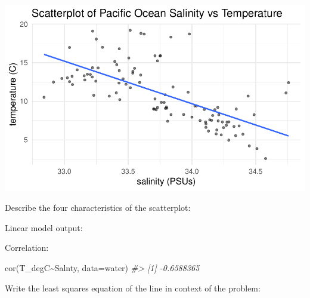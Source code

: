 \documentclass[
]{report}
\newenvironment{Shaded}{\begin{snugshade}}{\end{snugshade}}
\newcommand{\AttributeTok}[1]{\textcolor[rgb]{0.77,0.63,0.00}{#1}}
\newcommand{\CommentTok}[1]{\textcolor[rgb]{0.56,0.35,0.01}{\textit{#1}}}
\newcommand{\DecValTok}[1]{\textcolor[rgb]{0.00,0.00,0.81}{#1}}
\newcommand{\FunctionTok}[1]{\textcolor[rgb]{0.00,0.00,0.00}{#1}}
\newcommand{\NormalTok}[1]{#1}
\newcommand{\OtherTok}[1]{\textcolor[rgb]{0.56,0.35,0.01}{#1}}
\newcommand{\SpecialCharTok}[1]{\textcolor[rgb]{0.00,0.00,0.00}{#1}}
\begin{document}
\begin{center}\includegraphics[width=0.7\linewidth]{13-LN013-regression_files/figure-latex/unnamed-chunk-2-1} \end{center}

Describe the four characteristics of the scatterplot:

\vspace{1in}

Linear model output:

\begin{Shaded}
\end{Shaded}

\newpage

Correlation:

\begin{Shaded}
\begin{Highlighting}[]
\FunctionTok{cor}\NormalTok{(T\_degC}\SpecialCharTok{\textasciitilde{}}\NormalTok{Salnty, }\AttributeTok{data=}\NormalTok{water)}
\CommentTok{\#\textgreater{} [1] {-}0.6588365}
\end{Highlighting}
\end{Shaded}

Write the least squares equation of the line in context of the problem:
\end{document}
